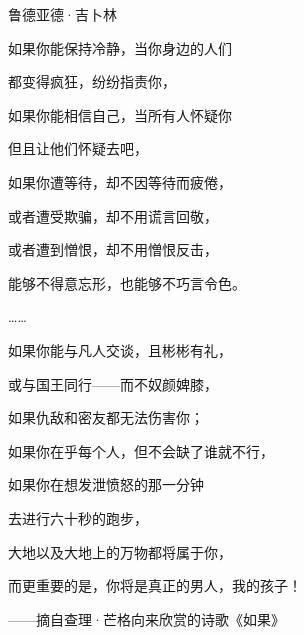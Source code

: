 \cleardoublepage
\begin{BookPoem}

{\kaishu\raggedleft 鲁德亚德·吉卜林\par}

如果你能保持冷静，当你身边的人们
\par

都变得疯狂，纷纷指责你，
\par

如果你能相信自己，当所有人怀疑你
\par

但且让他们怀疑去吧，
\par

如果你遭等待，却不因等待而疲倦，
\par

或者遭受欺骗，却不用谎言回敬，
\par

或者遭到憎恨，却不用憎恨反击，
\par

能够不得意忘形，也能够不巧言令色。
\par

……
\par

如果你能与凡人交谈，且彬彬有礼，
\par

或与国王同行——而不奴颜婢膝，
\par

如果仇敌和密友都无法伤害你；
\par

如果你在乎每个人，但不会缺了谁就不行，
\par

如果你在想发泄愤怒的那一分钟
\par

去进行六十秒的跑步，
\par

大地以及大地上的万物都将属于你，
\par

而更重要的是，你将是真正的男人，我的孩子！
\par

{\kaishu\raggedleft ——摘自查理·芒格向来欣赏的诗歌《如果》\par}
\end{BookPoem}
